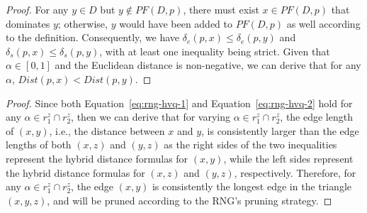 \newpage
\appendix
{}

\begin{proof}
\label{theorem:nearest_proof} 
{For any $y \in D$ but $y \notin PF(D, p)$, there must exist $x \in PF(D, p)$ that dominates $y$; otherwise, $y$ would have been added to $PF(D, p)$ as well according to the definition. Consequently, we have $\delta_e(p, x) \leq \delta_e(p, y)$ and $\delta_s(p, x) \leq \delta_s(p, y)$, with at least one inequality being strict. Given that $\alpha \in [0,1]$ and the Euclidean distance is non-negative, we can derive that for any $\alpha$, $Dist(p, x) < Dist(p, y)$.}
\end{proof}

\begin{proof}
\label{lemma:drng_proof} 
{Since both Equation~\ref{eq:rng-hvq-1} and Equation~\ref{eq:rng-hvq-2} hold for any $\alpha \in r^z_1 \cap r^z_2$, then we can derive that for varying $\alpha \in r^z_1 \cap r^z_2$, the edge length of $(x, y)$, i.e., the distance between $x$ and $y$, is consistently larger than the edge lengths of both $(x, z)$ and $(y, z)$ as the right sides of the two inequalities represent the hybrid distance formulas for $(x, y)$, while the left sides represent the hybrid distance formulas for $(x, z)$ and $(y, z)$, respectively. Therefore, for any $\alpha \in r^z_1 \cap r^z_2$, the edge $(x, y)$ is consistently the longest edge in the triangle $(x, y, z)$, and will be pruned according to the RNG's pruning strategy.}
\end{proof}

